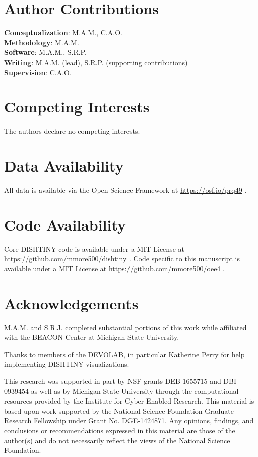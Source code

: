 \section*{Author Contributions}

\textbf{Conceptualization}: M.A.M., C.A.O. \\
\textbf{Methodology}: M.A.M. \\
\textbf{Software}: M.A.M., S.R.P. \\
\textbf{Writing}: M.A.M. (lead), S.R.P. (supporting contributions) \\
\textbf{Supervision}: C.A.O.

\section*{Competing Interests}

The authors declare no competing interests.

\section*{Data Availability}

All data is available via the Open Science Framework at \url{https://osf.io/prq49} \citep{Moreno_Rodriguez_Papa_2022}.

\section*{Code Availability}

Core DISHTINY code is available under a MIT License at \url{https://github.com/mmore500/dishtiny} \citep{moreno_2025_16990564}.
Code specific to this manuscript is available under a MIT License at \url{https://github.com/mmore500/oee4} \citep{matthew_andres_moreno_2024_16990558}.

\section*{Acknowledgements}

M.A.M. and S.R.J. completed substantial portions of this work while affiliated with the BEACON Center at Michigan State University.

Thanks to members of the DEVOLAB, in particular Katherine Perry for help implementing DISHTINY visualizations.

This research was supported in part by NSF grants DEB-1655715 and DBI-0939454 as well as by Michigan State University through the computational resources provided by the Institute for Cyber-Enabled Research.
This material is based upon work supported by the National Science Foundation Graduate Research Fellowship under Grant No. DGE-1424871.
Any opinions, findings, and conclusions or recommendations expressed in this material are those of the author(s) and do not necessarily reflect the views of the National Science Foundation.

